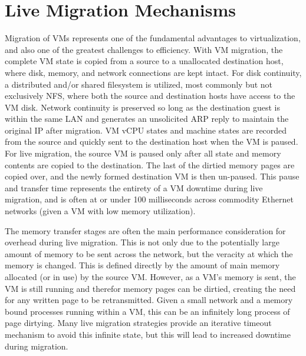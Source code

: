 \section{Live Migration Mechanisms}


Migration of VMs represents one of the fundamental advantages to virtualization, and also one of the greatest challenges to efficiency.  With VM migration, the complete VM state is copied from a source to a unallocated destination host, where disk, memory, and network connections are kept intact. For disk continuity, a distributed and/or shared filesystem is utilized, most commonly but not exclusively NFS, where both the source and destination hosts have access to the VM disk.  Network continuity is preserved so long as the destination guest is within the same LAN and generates an unsolicited ARP reply to maintain the original IP after migration.  VM vCPU states and machine states are recorded from the source and quickly sent to the destination host when the VM is paused. For live migration, the source VM is paused only after all state and memory contents are copied to the destination. The last of the dirtied memory pages are copied over, and the newly formed destination VM is then un-paused.  This pause and transfer time represents the entirety of a VM downtime during live migration, and is often at or under 100 milliseconds across commodity Ethernet networks (given a VM with low memory utilization).  

The memory transfer stages are often the main performance consideration for overhead during live migration. This is not only due to the potentially large amount of memory to be sent across the network, but the veracity at which the memory is changed.  This is defined directly by the amount of main memory allocated (or in use) by the source VM. However, as a VM's memory is sent, the VM is still running and therefor memory pages can be dirtied, creating the need for any written page to be retransmitted. Given a small network and a memory bound processes running within a VM, this can be an infinitely long process of page dirtying. Many live migration strategies provide an iterative timeout mechanism to avoid this infinite state, but this will lead to increased downtime during migration.  

